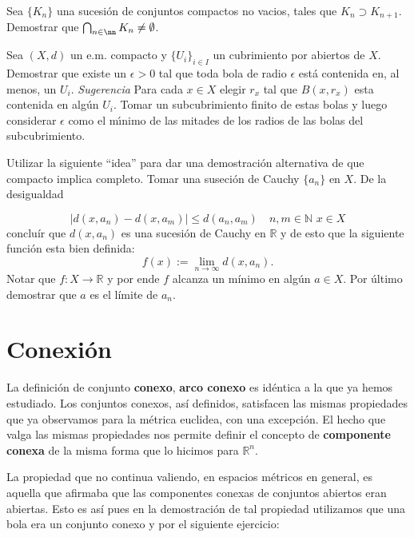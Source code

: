 \begin{ejercicio}{} Sea $\{K_n\}$ una sucesi\'on de conjuntos
compactos no vacios, tales que $K_n\supset K_{n+1}$. Demostrar que
$\bigcap_{n\in\nn}K_n\neq\emptyset$.
\end{ejercicio}

\begin{ejercicio}{} Sea $(X,d)$ un e.m. compacto y $\{U_i\}_{i\in
I}$ un cubrimiento por abiertos de $X$. Demostrar que existe un
$\epsilon>0$ tal que toda bola de radio $\epsilon$ est\'a
contenida en, al menos, un $U_i$. \emph{Sugerencia} Para cada
$x\in X$ elegir $r_x$ tal que $B(x,r_x)$ esta contenida en alg\'un
$U_i$. Tomar un subcubrimiento finito de estas bolas y luego
considerar $\epsilon$ como el m\'{\i}nimo de las mitades de los
radios de las bolas del subcubrimiento.
\end{ejercicio}

 
 \begin{ejercicio}{} Utilizar la siguiente ``idea'' para dar una
 demostración alternativa de que compacto implica completo. Tomar
 una suseción de Cauchy $\{a_n\}$ en $X$. De la desigualdad

 \[
	|d(x,a_n)-d(x,a_m)|\leq d(a_n,a_m)\quad n,m\in\mathbb{N}\,\,
	x\in X
 \]
 concluír que $d(x,a_n)$ es una sucesión de Cauchy en
 $\mathbb{R}$ y de esto que la siguiente función esta bien
 definida:
\[
	f(x):=\lim\limits_{n\to\infty}d(x,a_n).
\]
Notar que $f:X\to\mathbb{R}$ y por ende $f$ alcanza un mínimo en
algún $a\in X$. Por último demostrar que $a$ es el límite de
$a_n$.
\end{ejercicio}

\section{Conexión}La definición de conjunto \textbf{conexo},
\textbf{arco conexo} es idéntica a la que ya hemos estudiado. Los
conjuntos conexos, así definidos, satisfacen las mismas
propiedades que ya observamos para la métrica euclidea, con una
excepción. El hecho que valga las mismas propiedades nos permite
definir el concepto de \textbf{componente conexa} de la misma
forma que lo hicimos para $\mathbb{R}^n$.

La propiedad que no continua valiendo, en espacios métricos en
general, es aquella que afirmaba que las componentes conexas de
conjuntos abiertos eran abiertas. Esto es así pues en la
demostración de tal propiedad utilizamos que una bola era un
conjunto conexo y por el siguiente ejercicio:

